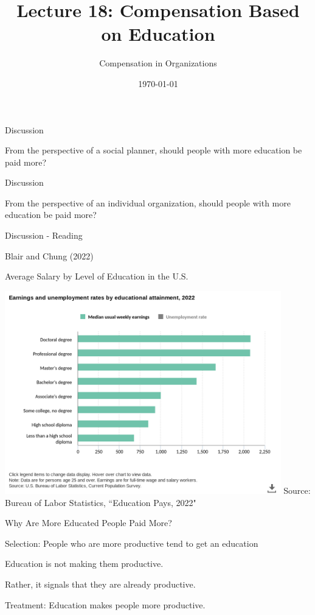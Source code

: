 \documentclass[aspectratio=169,usenames,dvipsnames]{beamer}
\title[diss]{Lecture 18: Compensation Based on Education} %
\author{Compensation in Organizations} %
\institute[shortinst]{Jacob Kohlhepp}
\date{\today} %
\newenvironment{wideitemize}{\itemize\addtolength{\itemsep}{10pt}}{\enditemize}
\begin{document}
\begin{frame}
\titlepage %

\end{frame}


\begin{frame}{Discussion}

\huge From the perspective of a social planner, should people with more education be paid more?
    
\end{frame}


\begin{frame}{Discussion}

\huge From the perspective of an individual organization, should people with more education be paid more?
\end{frame}


\begin{frame}{Discussion - Reading}

\huge Blair and Chung (2022)
\end{frame}


\begin{frame}{Average Salary by Level of Education in the U.S.}

    \includegraphics[width=0.9\textwidth]{pictures/earnings-and-unemploymen.png}
    Source: Bureau of Labor Statistics, ``Education Pays, 2022"
\end{frame}

\begin{frame}{Why Are More Educated People Paid More?}
    \begin{wideitemize}

        \item Selection: People who are more productive tend to get an education
        \begin{wideitemize}
            \item Education is not making them productive.
            \item Rather, it signals that they are already productive.
        \end{wideitemize}
        \item Treatment: Education makes people more productive.

    \end{wideitemize}
\end{frame}
\end{document}
